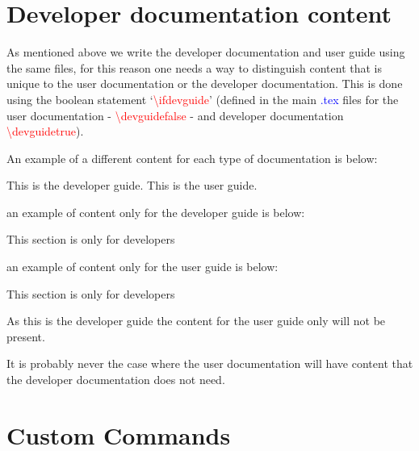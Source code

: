 \section{Developer documentation content}
\label{ch:documentation:devguide}

As mentioned above we write the developer documentation and user guide using the same files, for this reason one needs a way to distinguish content that is unique to the user documentation or the developer documentation. This is done using the boolean statement `\textcolor{red}{\textbackslash{ifdevguide}}' (defined in the main \textcolor{blue}{.tex} files for the user documentation - \textcolor{red}{\textbackslash{devguidefalse}} - and developer documentation \textcolor{red}{\textbackslash{devguidetrue}}). 

\noindent An example of a different content for each type of documentation is below:
\begin{latexbox}
\ifdevguide
This is the developer guide.
\else
This is the user guide.
\fi
\end{latexbox}

\noindent an example of content only for the developer guide is below:
\begin{latexbox}
\ifdevguide
This section is only for developers
\fi
\end{latexbox}

\noindent an example of content only for the user guide is below:
\begin{latexbox}
\ifdevguide
\else
This section is only for developers
\fi
\end{latexbox}
\begin{note}
As this is the developer guide the content for the user guide only will not be present.
\end{note}
\begin{note}
It is probably never the case where the user documentation will have content that the developer documentation does not need.
\end{note}


\clearpage
\newpage
\section{Custom Commands}
\label{ch:documentation:commands}

